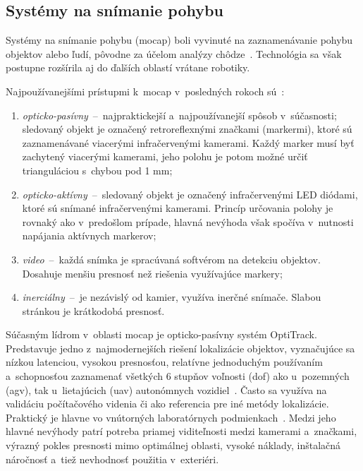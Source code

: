     \subsection{Systémy na snímanie pohybu}
    Systémy na snímanie pohybu (\acrshort{mocap}) boli vyvinuté na zaznamenávanie pohybu objektov alebo ľudí, pôvodne za účelom analýzy chôdze~\cite{furtadoComparativeAnalysisOptitrack18}. Technológia sa však postupne rozšírila aj do ďalších oblastí vrátane robotiky.

    Najpoužívanejšími prístupmi k~\acrshort{mocap} v~posledných rokoch sú~\cite{furtadoComparativeAnalysisOptitrack18}:
    \begin{enumerate}
      \item \emph{opticko-pasívny}~--~najpraktickejší a~najpoužívanejší spôsob v~súčasnosti; sledovaný objekt je označený retroreflexnými značkami (markermi), ktoré sú zaznamenávané viacerými infračervenými kamerami. Každý marker musí byť zachytený viacerými kamerami, jeho polohu je potom možné určiť trianguláciou s~chybou pod 1 mm;
      \item \emph{opticko-aktívny}~--~sledovaný objekt je označený infračervenými LED diódami, ktoré sú snímané infračervenými kamerami. Princíp určovania polohy je rovnaký ako v~predošlom prípade, hlavná nevýhoda však spočíva v~nutnosti napájania aktívnych markerov;
      \item \emph{video}~--~každá snímka je spracúvaná softvérom na detekciu objektov. Dosahuje menšiu presnosť než riešenia využívajúce markery;
      \item \emph{inerciálny}~--~je nezávislý od kamier, využíva inerčné snímače. Slabou stránkou je krátkodobá presnosť.
    \end{enumerate}
  
    Súčasným lídrom v~oblasti \acrshort{mocap} je opticko-pasívny systém OptiTrack. Predstavuje jedno z~najmodernejších riešení lokalizácie objektov, vyznačujúce sa nízkou latenciou, vysokou presnosťou, relatívne jednoduchým používaním a~schopnosťou zaznamenať všetkých 6 stupňov voľnosti (\acrshort{dof}) ako u~pozemných (\acrshort{agv}), tak u~lietajúcich (\acrshort{uav}) autonómnych vozidiel~\cite{MotionCaptureRobotics}. Často sa využíva na validáciu počítačového videnia či ako referencia pre iné metódy lokalizácie. Praktický je hlavne vo vnútorných laboratórnych podmienkach~\cite{furtadoComparativeAnalysisOptitrack18}. Medzi jeho hlavné nevýhody patrí potreba priamej viditeľnosti medzi kamerami a~značkami, výrazný pokles presnosti mimo optimálnej oblasti, vysoké náklady, inštalačná náročnosť a~tiež nevhodnosť použitia v~exteriéri.

